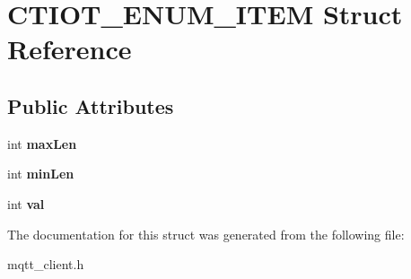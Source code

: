 \hypertarget{struct_c_t_i_o_t___e_n_u_m___i_t_e_m}{}\section{C\+T\+I\+O\+T\+\_\+\+E\+N\+U\+M\+\_\+\+I\+T\+EM Struct Reference}
\label{struct_c_t_i_o_t___e_n_u_m___i_t_e_m}
\subsection*{Public Attributes}
\begin{DoxyCompactItemize}
\item 
\mbox{\label{struct_c_t_i_o_t___e_n_u_m___i_t_e_m_a3df556bd02b30aad1317b5f047895761}} 
int {\bfseries max\+Len}
\item 
\mbox{\label{struct_c_t_i_o_t___e_n_u_m___i_t_e_m_abbaefaa7807b8491da396c16d5718787}} 
int {\bfseries min\+Len}
\item 
\mbox{\label{struct_c_t_i_o_t___e_n_u_m___i_t_e_m_a64248409e70ab24e90322b564868a6d1}} 
int {\bfseries val}
\end{DoxyCompactItemize}


The documentation for this struct was generated from the following file\+:\begin{DoxyCompactItemize}
\item 
mqtt\+\_\+client.\+h\end{DoxyCompactItemize}
